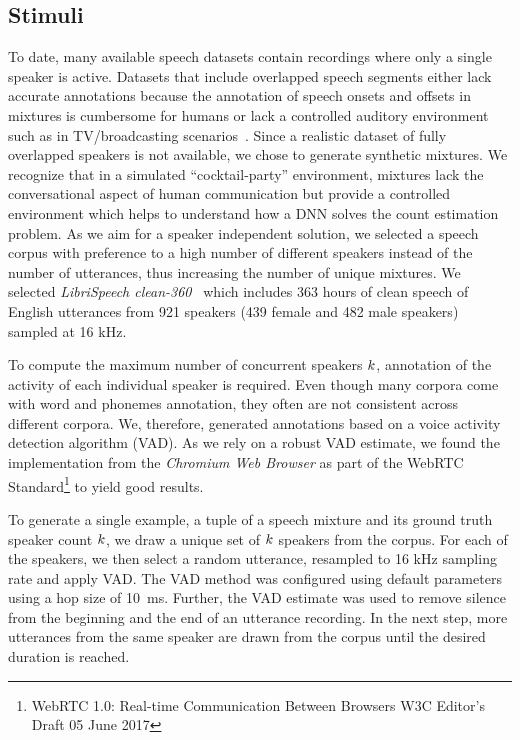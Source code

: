 \subsection{Stimuli}
To date, many available speech datasets contain recordings where only a single speaker is active.
Datasets that include overlapped speech segments either lack accurate annotations because the annotation of speech onsets and offsets in mixtures is cumbersome for humans or lack a controlled auditory environment such as in TV/broadcasting scenarios~\cite{Gravier12}.
Since a realistic dataset of fully overlapped speakers is not available, we chose to generate synthetic mixtures.
We recognize that in a simulated ``cocktail-party'' environment, mixtures lack the conversational aspect of human communication but provide a controlled environment which helps to understand how a DNN solves the count estimation problem.
As we aim for a speaker independent solution, we selected a speech corpus with preference to a high number of different speakers instead of the number of utterances, thus increasing the number of unique mixtures.
We selected \emph{LibriSpeech clean-360}~\cite{panayotov15} which includes 363 hours of clean speech of English utterances from 921 speakers (439 female and 482 male speakers) sampled at 16 kHz.
\par
To compute the maximum number of concurrent speakers \(k\), annotation of the activity of each individual speaker is required.
Even though many corpora come with word and phonemes annotation, they often are not consistent across different corpora.
We, therefore, generated annotations based on a voice activity detection algorithm (VAD). As we rely on a robust VAD estimate, we found the implementation from the \emph{Chromium Web Browser} as part of the WebRTC Standard\footnote{WebRTC 1.0: Real-time Communication Between Browsers W3C Editor's Draft 05 June 2017} to yield good results.
\par
To generate a single example, a tuple of a speech mixture and its ground truth speaker count \(k \), we draw a unique set of \(k \) speakers from the corpus.
For each of the speakers, we then select a random utterance, resampled to 16 kHz sampling rate and apply VAD.\@
The VAD method was configured using default parameters using a hop size of \SI{10}{\milli\second}.
Further, the VAD estimate was used to remove silence from the beginning and the end of an utterance recording.
In the next step, more utterances from the same speaker are drawn from the corpus until the desired duration is reached.
